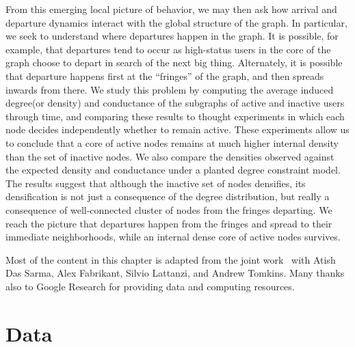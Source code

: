 \documentclass[phd,tocprelim]{cornell}
\begin{document}
From this emerging local picture of behavior, we may then ask how
arrival and departure dynamics interact with the global structure of
the graph.  In particular, we seek to understand where departures
happen in the graph.  It is possible, for example, that departures
tend to occur as high-status users in the core of the graph choose to
depart in search of the next big thing.  Alternately, it is possible
that departure happens first at the ``fringes'' of the graph, and then
spreads inwards from there.  We study this problem by computing the
average induced degree(or density) and conductance of the subgraphs of active and inactive users
through time, and comparing these results to thought experiments in
which each node decides independently whether to remain active.  These
experiments allow us to conclude that a core of active nodes remains
at much higher internal density than the set of inactive nodes. We
also compare the densities observed against the expected density and
conductance under a planted degree constraint model.  The results
suggest that although the inactive set of nodes densifies, its densification is
not just a consequence of the degree distribution, but really a
consequence of well-connected cluster of nodes from the fringes
departing.  We reach the picture that departures happen from the
fringes and spread to their immediate neighborhoods, while
an internal dense core of active nodes survives.

Most of the content in this chapter is adapted from the joint work~\cite{Wu-2013} with Atish Das Sarma, Alex Fabrikant, Silvio Lattanzi, and Andrew Tomkins. Many thanks also to Google Research for providing data and computing resources.




\section{Data}
\end{document}
